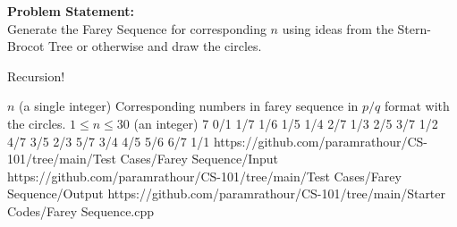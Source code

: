 \documentclass[../../Problems]{subfiles}
\begin{document}
\textbf{Problem Statement:}\\
Generate the Farey Sequence for corresponding $n$ using ideas from the Stern-Brocot Tree or otherwise and draw the circles.
\begin{hint}
	Recursion!
\end{hint}
\begin{testcasesMore}
	{$n$ \hfill(a single integer)}
	{Corresponding numbers in farey sequence in $p/q$ format with the circles.}
	{$1\leq n\leq 30$ \hfill(an integer)}
	{7}
	{0/1 1/7 1/6 1/5 1/4 2/7 1/3 2/5 3/7 1/2 4/7 3/5 2/3 5/7 3/4 4/5 5/6 6/7 1/1}
	{https://github.com/paramrathour/CS-101/tree/main/Test Cases/Farey Sequence/Input}
	{https://github.com/paramrathour/CS-101/tree/main/Test Cases/Farey Sequence/Output}
	{https://github.com/paramrathour/CS-101/tree/main/Starter Codes/Farey Sequence.cpp}
\end{testcasesMore}
\end{document}
